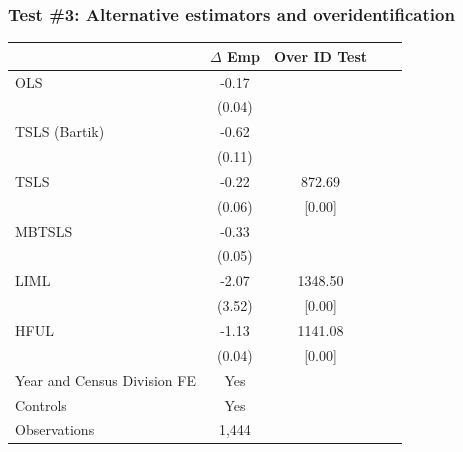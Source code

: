 \documentclass[notes,11pt, aspectratio=169]{beamer}
\begin{document}
\begin{frame}[fragile,label=sh_results]
\frametitle{Test \#3: Alternative estimators and overidentification}


\small
\begin{table}[htbp]
\label{table:olsiv_bartik}
\begin{center}
  \begin{tabular}{l*{4}{c}}
\toprule
  & \multicolumn{1}{c}{$\Delta$ Emp} & Over ID Test\\
\midrule
OLS  & -0.17 &  \\
    & \textcolor{gray!75}{(0.04)}&         & \\
TSLS (Bartik)  & -0.62 &  \\
              &  \textcolor{gray!75}{(0.11) }&         & \\
TSLS           & -0.22 & 872.69\\
              &  \textcolor{gray!75}{(0.06)}        & [0.00]\\
MBTSLS  & -0.33 & \\
    &  \textcolor{gray!75}{(0.05)}&         & \\
LIML  & -2.07 & 1348.50\\
    &  \textcolor{gray!75}{(3.52)}&          [0.00]\\
HFUL & -1.13 &  1141.08\\
    &  \textcolor{gray!75}{(0.04)}&         [0.00]\\
\midrule
Year and Census Division FE&            Yes\\
Controls        &           Yes\\
Observations    &      1,444\\
\bottomrule
\end{tabular}
\end{center}
\end{table}

\end{frame}




\end{document}
